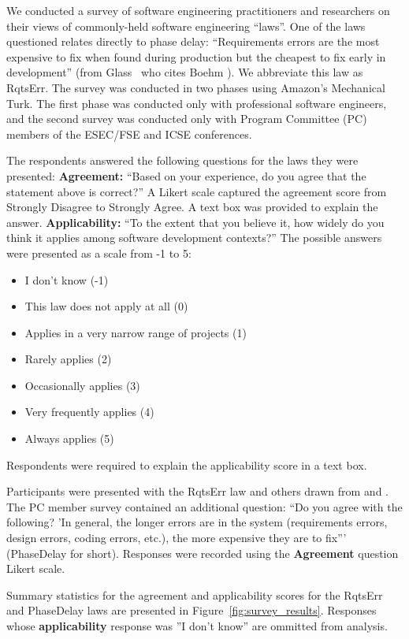 We conducted a survey of software engineering practitioners and researchers on their views of commonly-held software engineering ``laws''. One of the laws questioned relates directly to phase delay: ``Requirements errors are the most expensive to fix when found during production but the cheapest to fix early in development'' (from Glass~\cite{glass02} who cites Boehm ). We abbreviate this law as RqtsErr. The survey was conducted in two phases using Amazon's Mechanical Turk. The first phase was conducted only with professional software engineers, and the second survey was conducted only with Program Committee (PC) members of the ESEC/FSE and ICSE conferences.

The respondents answered the following questions for the laws they were presented: \newline
\textbf{Agreement:} ``Based on your experience, do you agree that the statement above is correct?'' A Likert scale captured the agreement score from Strongly Disagree to Strongly Agree. A text box was provided to explain the answer. \newline
\textbf{Applicability:} ``To the extent that you believe it, how widely do you think it applies among software development contexts?'' The possible answers were presented as a scale from -1 to 5:
\begin{itemize}
\item I don't know (-1)
\item This law does not apply at all (0)
\item Applies in a very narrow range of projects  (1)
\item Rarely applies (2)
\item Occasionally applies (3)
\item Very frequently applies (4)
\item Always applies (5)
\end{itemize}
Respondents were required to explain the applicability score in a text box.

Participants were presented with the RqtsErr law and others drawn from \cite{glass02} and \cite{endres03}. The PC member survey contained an additional question: ``Do you agree with the following? 'In general, the longer errors are in the system (requirements errors, design errors, coding errors, etc.), the more expensive they are to fix''' (PhaseDelay for short). Responses were recorded using the \textbf{Agreement} question Likert scale. 

Summary statistics for the agreement and applicability scores for the RqtsErr and PhaseDelay laws are presented in Figure~\ref{fig:survey_results}. Responses whose \textbf{applicability} response was ''I don't know'' are ommitted from analysis.


